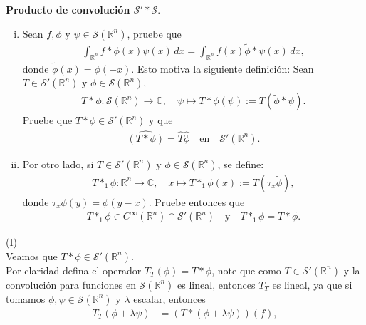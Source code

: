 \begin{homeworkProblem}
  \textbf{Producto de convolución $\mathcal{S}'*\mathcal{S}$}.
  \begin{enumerate}[(i)]
    \item Sean $f, \phi$ y $\psi \in \mathcal{S}(\mathbb{R}^{n})$, pruebe que
      \begin{align*}
        \int_{\mathbb{R}^{n}} f * \phi(x) \psi(x) \, dx = \int_{\mathbb{R}^{n}} f(x) \tilde{\phi} * \psi(x) \, dx,
      \end{align*}
      donde $\tilde{\phi}(x) = \phi(-x)$. Esto motiva la siguiente definición: Sean $T \in \mathcal{S}'(\mathbb{R}^{n})$ y $\phi \in \mathcal{S}(\mathbb{R}^{n})$,
      \begin{align*}
        T * \phi : \mathcal{S}(\mathbb{R}^{n}) \longrightarrow \mathbb{C}, \quad \psi \longmapsto T * \phi(\psi) := T(\tilde{\phi} * \psi).
      \end{align*}
      Pruebe que $T * \phi \in \mathcal{S}'(\mathbb{R}^{n})$ y que
      \begin{align*}
        \hat{(T * \phi)} = \hat{T} \hat{\phi} \quad \text{en} \quad \mathcal{S}'(\mathbb{R}^{n}).
      \end{align*}
    \item Por otro lado, si $T \in \mathcal{S}'(\mathbb{R}^{n})$ y $\phi \in \mathcal{S}(\mathbb{R}^{n})$, se define:
      \begin{align*}
        T *_1 \phi : \mathbb{R}^{n} \longrightarrow \mathbb{C}, \quad x \longmapsto T *_1 \phi(x) := T(\tau_x \tilde{\phi}),
      \end{align*}
      donde $\tau_x \phi(y) = \phi(y - x)$. Pruebe entonces que
      \begin{align*}
        T *_1 \phi \in C^\infty(\mathbb{R}^{n}) \cap \mathcal{S}'(\mathbb{R}^{n}) \quad \text{y} \quad T *_1 \phi = T * \phi.
      \end{align*}
  \end{enumerate}
  \begin{solution}
    (I)\\
    Veamos que $T*\phi \in \mathcal{S}'(\mathbb{R}^{n})$.\\
    Por claridad defina el operador $T_{T}(\phi)=T*\phi$, note que como $T\in\mathcal{S}'(\mathbb{R}^{n})$ y la convolución para funciones en $\mathcal{S}(\mathbb{R}^{n})$ es lineal, entonces $T_{T}$ es lineal, ya que si tomamos $\phi,\psi\in\mathcal{S}(\mathbb{R}^{n})$ y $\lambda$ escalar, entonces 
    \begin{align*}
      T_{T}(\phi+\lambda\psi)&=\left(T*\left( \phi+\lambda\psi \right)\right)(f),\\

\end{align*}
\end{solution}
\end{homeworkProblem}
